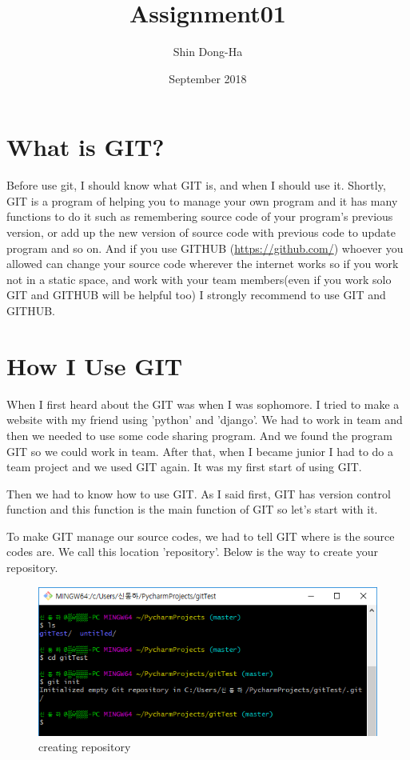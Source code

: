 \documentclass{article}
\title{Assignment01}
\author{Shin Dong-Ha}
\date{September 2018}
\begin{document}
\maketitle

\section{What is GIT?}
Before use git, I should know what GIT is, and when I should use it. Shortly, GIT is a program of helping you to manage your own program and it has many functions to do it such as remembering source code of your program's previous version, or add up the new version of source code with previous code to update program and so on. And if you use GITHUB (\url{https://github.com/}) whoever you allowed can change your source code wherever the internet works so if you work not in a static space, and work with your team members(even if you work solo GIT and GITHUB will be helpful too) I strongly recommend to use GIT and GITHUB.


\section{How I Use GIT}
When I first heard about the GIT was when I was sophomore. I tried to make a website with my friend using 'python' and 'django'. We had to work in team and then we needed to use some code sharing program. And we found the program GIT so we could work in team. After that, when I became junior I had to do a team project and we used GIT again. It was my first start of using GIT.

Then we had to know how to use GIT. As I said first, GIT has version control function and this function is the main function of GIT so let's start with it.

To make GIT manage our source codes, we had to tell GIT where is the source codes are. We call this location 'repository'. Below is the way to create your repository.

\newpage

\begin{figure}[h]
\centering
\includegraphics[scale=0.75]{init.png}
\caption{creating repository}
\label{fig:creating repository}
\end{figure}
\end{document}
